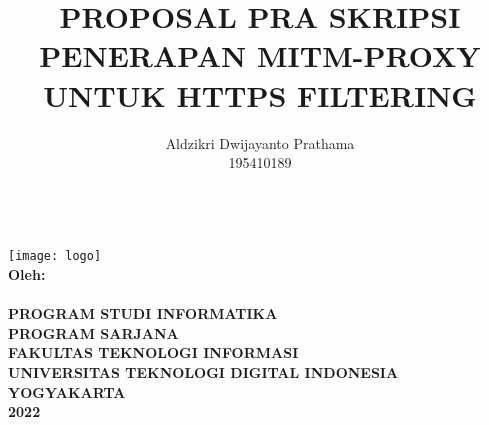 \documentclass[../PROPOSAL_PRA_SKRIPSI_ALDZIKRI_DWIJAYANTO_PRATHAMA.tex]{subfiles}
\begin{document}
\title{{\large PROPOSAL PRA SKRIPSI\\
  \Large{PENERAPAN MITM-PROXY UNTUK HTTPS FILTERING}}}
\author{Aldzikri Dwijayanto Prathama
    \\195410189}
\makeatletter
\begin{titlepage}
    \begin{center}
        {\huge \bfseries \@title}\\[14ex]
        \texttt{[image: logo]}\\[4ex]
        {\large \bfseries Oleh:\\ \@author}\\[12ex]
        {\large \bfseries {PROGRAM STUDI INFORMATIKA\\
        PROGRAM SARJANA\\
        FAKULTAS TEKNOLOGI INFORMASI\\
        UNIVERSITAS TEKNOLOGI DIGITAL INDONESIA\\
        YOGYAKARTA\\
        2022}}
    \end{center}
\end{titlepage}
\makeatother
\end{document}
